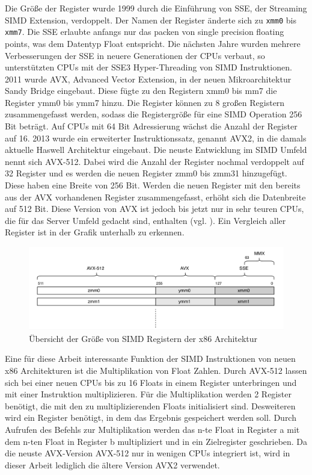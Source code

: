 \documentclass[../main.tex]{subfiles}
\begin{document}
Die Größe der Register wurde 1999 durch die Einführung von SSE, der Streaming SIMD Extension, verdoppelt. Der Namen der Register änderte sich zu \texttt{xmm0} bis \texttt{xmm7}. Die SSE erlaubte anfangs nur das packen von single precision floating points, was dem Datentyp Float entspricht. Die nächsten Jahre wurden mehrere Verbesserungen der SSE in neuere Generationen der CPUs verbaut, so unterstützten CPUs mit der SSE3 Hyper-Threading von SIMD Instruktionen.
2011 wurde AVX, Advanced Vector Extension, in der neuen Mikroarchitektur Sandy Bridge eingebaut. Diese fügte zu den Registern xmm0 bis mm7 die Register ymm0 bis ymm7 hinzu. Die Register können zu 8 großen Registern zusammengefasst werden, sodass die Registergröße für eine SIMD Operation 256 Bit beträgt. Auf CPUs mit 64 Bit Adressierung wächst die Anzahl der Register auf 16. 2013 wurde ein erweiterter Instruktionssatz, genannt AVX2, in die damals aktuelle Haswell Architektur eingebaut.
Die neuste Entwicklung im SIMD Umfeld nennt sich AVX-512. Dabei wird die Anzahl der Register nochmal verdoppelt auf 32 Register und es werden die neuen Register zmm0 bis zmm31 hinzugefügt. Diese haben eine Breite von 256 Bit. Werden die neuen Register mit den bereits aus der AVX vorhandenen Register zusammengefasst, erhöht sich die Datenbreite auf 512 Bit. Diese Version von AVX ist jedoch bis jetzt nur in sehr teuren CPUs, die für das Server Umfeld gedacht sind, enthalten (vgl. \cite{IntelAvx512}).
Ein Vergleich aller Register ist in der Grafik unterhalb zu erkennen.

\begin{figure}[!htbp]
	\centering
	\includegraphics[width=\textwidth]{../images/Benz/simd_avx_sse_mmx.png}
	\caption{Übersicht der Größe von SIMD Registern der x86 Architektur} 
	\label{fig:simd_avx_sse_mmx}
\end{figure}

Eine für diese Arbeit interessante Funktion der SIMD Instruktionen von neuen x86 Architekturen ist die Multiplikation von Float Zahlen. Durch AVX-512 lassen sich bei einer neuen CPUs bis zu 16 Floats in einem Register unterbringen und mit einer Instruktion multiplizieren. Für die Multiplikation werden 2 Register benötigt, die mit den zu multiplizierenden Floats initialisiert sind. Desweiteren wird ein Register benötigt, in dem das Ergebnis gespeichert werden soll. Durch Aufrufen des Befehls zur Multiplikation werden das n-te Float in Register a mit dem n-ten Float in Register b multipliziert und in ein Zielregister geschrieben.
Da die neuste AVX-Version AVX-512 nur in wenigen CPUs integriert ist, wird in dieser Arbeit lediglich die ältere Version AVX2 verwendet.
\end{document}
